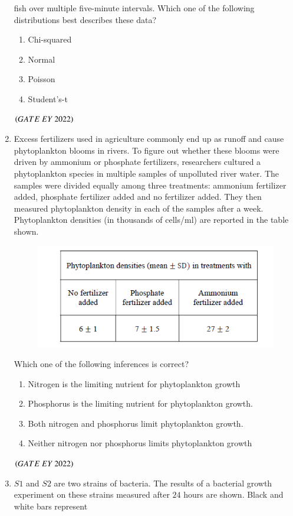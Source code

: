\documentclass[journal]{IEEEtran}
\numberwithin{equation}{enumi}
\numberwithin{figure}{enumi}
\begin{document}
\begin{enumerate}
fish over multiple five-minute intervals. Which one of the following distributions best
describes these data?
    \begin{enumerate}
        \item  Chi-squared
        \item  Normal
        \item  Poisson
        \item  Student's-t
    \end{enumerate}
    \hfill{$\brak{ GATE\ EY\ 2022}$}
    \bigskip
 \item Excess fertilizers used in agriculture commonly end up as runoff and cause
phytoplankton blooms in rivers. To figure out whether these blooms were driven by
ammonium or phosphate fertilizers, researchers cultured a phytoplankton species in
multiple samples of unpolluted river water. The samples were divided equally among
three treatments: ammonium fertilizer added, phosphate fertilizer added and no
fertilizer added. They then measured phytoplankton density in each of the samples
after a week. Phytoplankton densities (in thousands of cells/ml) are reported in the
table shown.
\begin{figure}[H]
    \centering
\includegraphics[width=0.5\columnwidth]{figs/7.png}
    \caption{}
    \label{fig:7}
   \end{figure}
Which one of the following inferences is correct?
    \begin{enumerate}
        \item  Nitrogen is the limiting nutrient for phytoplankton growth
        \item  Phosphorus is the limiting nutrient for phytoplankton growth.
        \item  Both nitrogen and phosphorus limit phytoplankton growth.
        \item  Neither nitrogen nor phosphorus limits phytoplankton growth
    \end{enumerate}
    \hfill{$\brak{ GATE\ EY\ 2022}$}
    \bigskip
 \item $S1$ and $S2$ are two strains of bacteria. The results of a bacterial growth experiment
on these strains measured after $24$ hours are shown. Black and white bars represent

\end{enumerate}
\end{document}
